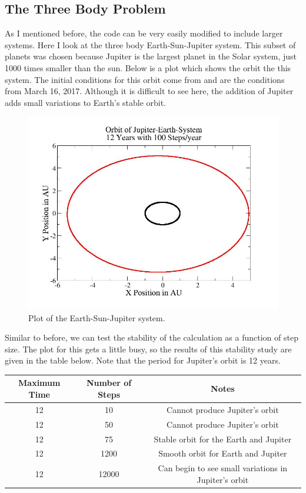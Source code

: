 \documentclass[%
oneside,                 %
final,                   %
10pt]{article}
\begin{document}
\subsection{The Three Body Problem}

As I mentioned before, the code can be very easily modified to include larger systems.  Here I look at the three body Earth-Sun-Jupiter system.  This subset of planets was chosen because Jupiter is the largest planet in the Solar system, just 1000 times smaller than the sun.  Below is a plot which shows the orbit the this system.  The initial conditions for this orbit come from \cite{JPL} and are the conditions from March 16, 2017.  Although it is difficult to see here, the addition of Jupiter adds small variations to Earth's stable orbit.

\begin{figure}[H]\label{fig:velrplot}
  \centering
    \includegraphics[width=1.1\textwidth]{JESOrbit.jpg}
    \caption{Plot of the Earth-Sun-Jupiter system.}
\end{figure}

Similar to before, we can test the stability of the calculation as a function of step size.  The plot for this gets a little busy, so the results of this stability study are given in the table below.  Note that the period for Jupiter's orbit is 12 years.

\begin{center} 
\begin{tabular}{ |c|c|c| }
\hline
Maximum Time & Number of Steps & Notes \\
\hline
12& 10 & Cannot produce Jupiter's orbit \\
12 & 50 & Cannot produce Jupiter's orbit \\
12 & 75 & Stable orbit for the Earth and Jupiter \\
12 & 1200 & Smooth orbit for Earth and Jupiter \\
12 & 12000 & Can begin to see small variations in Jupiter's orbit\\
\hline
\end{tabular}
\label{table:test}
\end{center}
\end{document}
